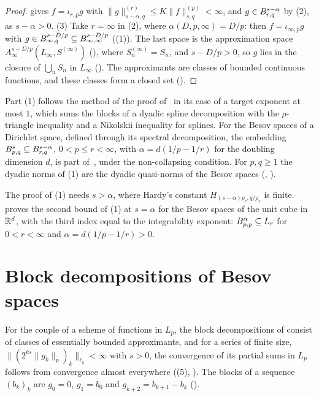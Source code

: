 \begin{proof}
gives $f = \iota_{r,p} g$ with $\|g\|^{(r)}_{s - \alpha, q} \leq K \|f\|^{(p)}_{s, q} < \infty$,
and $g \in B^{s-\alpha}_{r,q}$ by (2), as $s - \alpha > 0$. (3) Take
$r = \infty$ in (2), where $\alpha(D, p, \infty) = D/p$: then $f = \iota_{\infty,p} g$ with
$g \in B^{s - D/p}_{\infty,q} \subseteq B^{s - D/p}_{\infty,\infty}$
((1)). The last space is the approximation space
$A^{s - D/p}_\infty(L_\infty, S^{(\infty)})$ (), where
$S^{(\infty)}_n = S_n$, and $s - D/p > 0$, so $g$ lies in the closure of $\bigcup_n S_n$ in
$L_\infty$ (). The approximants are classes of bounded continuous
functions, and these classes form a closed set ().
\end{proof}

Part (1) follows the method of the proof of~\cite[Theorem~7.1]{DeVorePopovTAMS} in its case of a
target exponent at most $1$, which sums the blocks of a dyadic spline decomposition with the
$\rho$-triangle inequality and a Nikolskii inequality for splines. For the Besov spaces of a
Dirichlet space, defined through its spectral decomposition, the embedding
$B^{s}_{p,q} \subseteq B^{s - \alpha}_{r,q}$, $0 < p \leq r < \infty$, with
$\alpha = d(1/p - 1/r)$ for the doubling dimension $d$, is part
of~\cite[Proposition~6.14]{KerkyacharianPetrushev2015}, under the non-collapsing condition. For
$p, q \geq 1$ the dyadic norms of (1) are the dyadic quasi-norms of the Besov spaces
(, ).

The proof of (1) needs $s > \alpha$, where Hardy's constant $H_{(s-\alpha)\rho_r, q/\rho_r}$ is
finite. \cite[Theorem~7.1]{DeVorePopovTAMS} proves the second bound of (1) at $s = \alpha$ for
the Besov spaces of the unit cube in $\mathbb{R}^d$, with the third index equal to the integrability
exponent: $B^{\alpha}_{p,p} \subseteq L_r$ for $0 < r < \infty$ and $\alpha = d(1/p - 1/r) > 0$.

\section{Block decompositions of Besov spaces}
\label{sec:besov-blocks}

For the couple of a scheme of functions in $L_p$, the block decompositions of
 consist of classes of essentially bounded approximants, and
for a series of finite size, $\|(2^{ks} \|g_k\|_p)_k\|_{\ell_q} < \infty$ with $s > 0$, the
convergence of its partial sums in $L_p$ follows from convergence almost everywhere
((5), ). The blocks of a sequence
$(b_k)_k$ are $g_0 = 0$, $g_1 = b_0$ and $g_{k+2} = b_{k+1} - b_k$
().

